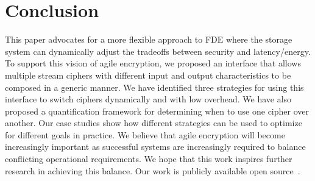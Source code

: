 \section{Conclusion}\label{sec:conclusion}

This paper advocates for a more flexible approach to FDE where the storage
system can dynamically adjust the tradeoffs between security and latency/energy.
To support this vision of agile encryption, we proposed an interface that allows
multiple stream ciphers with different input and output characteristics to be
composed in a generic manner. We have identified three strategies for using this
interface to switch ciphers dynamically and with low overhead. We have also
proposed a quantification framework for determining when to use one cipher over
another. Our case studies show how different strategies can be used to optimize
for different goals in practice. We believe that agile encryption will become
increasingly important as successful systems are increasingly required to
balance conflicting operational requirements. We hope that this work inspires
further research in achieving this balance. Our work is publicly available open
source~.


